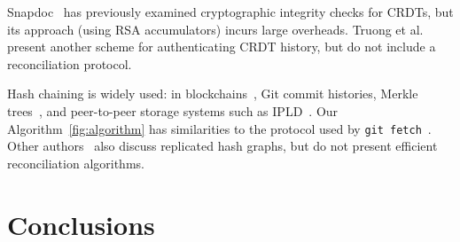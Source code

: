 \documentclass[a4paper,anonymous,USenglish]{lipics-v2019}
\begin{document}
Snapdoc~\cite{Kollmann:2019hf} has previously examined cryptographic integrity checks for CRDTs, but its approach (using RSA accumulators) incurs large overheads.
Truong et al.~\cite{Truong:2012et} present another scheme for authenticating CRDT history, but do not include a reconciliation protocol.

Hash chaining is widely used: in blockchains~\cite{Bano:2019}, Git commit histories, Merkle trees~\cite{Merkle:1987}, and peer-to-peer storage systems such as IPLD~\cite{IPLD}.
Our Algorithm~\ref{fig:algorithm} has similarities to the protocol used by \texttt{git fetch}~\cite{GitHTTP}.
Other authors~\cite{Baird:2016tq,Kang:2003} also discuss replicated hash graphs, but do not present efficient reconciliation algorithms.











\section{Conclusions}
\end{document}
